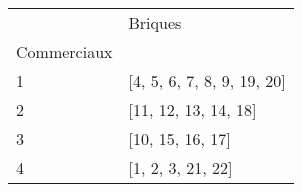 \documentclass[preview]{standalone}
\begin{document}
    \begin{tabular}{ll}
\toprule
 & Briques \\
Commerciaux &  \\
\midrule
1 & [4, 5, 6, 7, 8, 9, 19, 20] \\
2 & [11, 12, 13, 14, 18] \\
3 & [10, 15, 16, 17] \\
4 & [1, 2, 3, 21, 22] \\
\bottomrule
\end{tabular}

    
\end{document}
